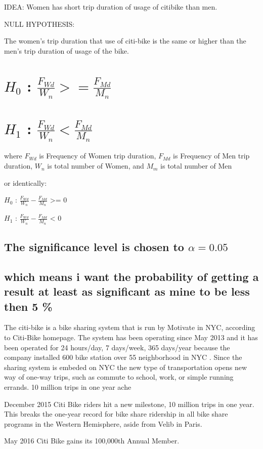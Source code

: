 IDEA:
Women has short trip duration of usage of citibike than men.

NULL HYPOTHESIS:

The women's trip duration that use of citi-bike is the same or higher than the men's trip duration of usage of the bike.

\section{$H_0$ : $\frac{F_{Wd}}{W_{n}} >= \frac{F_{Md}}{M_{n}} $ }



\section{$H_1$ : $\frac{F_{Wd}}{W_{n}} < \frac{F_{Md}}{M_{n}} $}

where $F_{Wd}$ is Frequency of Women trip duration, $F_{Md}$ is Frequency of Men trip duration, ${W_{n}}$ is total number of Women, and ${M_{m}}$ is total number of Men

or identically:

$H_0$ : $\frac{F_{Wd}}{W_{n}} - \frac{F_{Md}}{M_{n}} $ >= 0

$H_1$ : $\frac{F_{Wd}}{W_{n}} - \frac{F_{Md}}{M_{n}} $ < 0

\subsection{The significance level is chosen to $\alpha=0.05$}

\subsection{which means i want the probability of getting a result at least as significant as mine to be less then 5 \%}


The citi-bike is a bike sharing system that is run by Motivate in NYC, according to Citi-Bike homepage\cite{nyc}. The system has been operating since May 2013 and it has been operated for 24 hours/day, 7 days/week, 365 days/year because the company installed 600 bike station over 55 neighborhood in NYC \cite{nyc}. Since the sharing system is embeded on NYC the new type of transportation opens new way of one-way trips, such as commute to school, work, or simple running errands. 10 million trips in one year ache


December 2015
Citi Bike riders hit a new milestone, 10 million trips in one year. This breaks the one-year record for bike share ridership in all bike share programs in the Western Hemisphere, aside from Velib in Paris.

May 2016
Citi Bike gains its 100,000th Annual Member.
